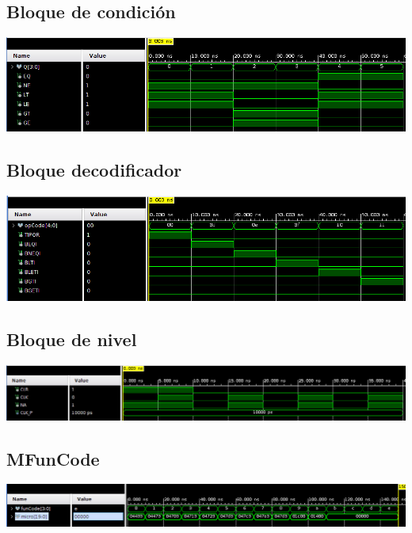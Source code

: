 \documentclass[8pt,executivepaper]{article}
\begin{document}
\subsection{Bloque de condición}
\begin{center}
  \includegraphics[scale=0.5]{img/condition.png}
\end{center}
\subsection{Bloque decodificador}
\begin{center}
  \includegraphics[scale=0.5]{img/decodificador.png}
\end{center}
\subsection{Bloque de nivel}
\begin{center}
  \includegraphics[scale=0.4]{img/level.png}
\end{center}
\subsection{MFunCode}
\begin{center}
  \includegraphics[scale=0.4]{img/mfuncode.png}
\end{center}
\end{document}
